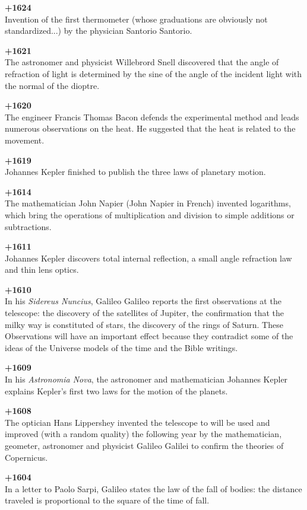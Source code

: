 \textbf{+1624}\\
Invention of the first thermometer (whose graduations are obviously not standardized...) by the physician Santorio Santorio.

\textbf{+1621}\\
The astronomer and physicist Willebrord Snell discovered that the angle of refraction of light is determined by the sine of the angle of the incident light with the normal of the dioptre.

\textbf{+1620}\\
The engineer Francis Thomas Bacon defends the experimental method and leads numerous observations on the heat. He suggested that the heat is related to the movement.

\textbf{+1619}\\
Johannes Kepler finished to publish the three laws of planetary motion.

\textbf{+1614}\\
The mathematician John Napier (John Napier in French) invented logarithms, which bring the operations of multiplication and division to simple additions or subtractions.

\textbf{+1611}\\
Johannes Kepler discovers total internal reflection, a small angle refraction law and thin lens optics.

\textbf{+1610}\\ In his \textit{Sidereus Nuncius}, Galileo Galileo reports the first observations at the telescope: the discovery of the satellites of Jupiter, the confirmation that the milky way is constituted of stars, the discovery of the rings of Saturn. These
Observations will have an important effect because they contradict some of the ideas of the Universe models of the time and the Bible writings.

\textbf{+1609}\\
In his \textit{Astronomia Nova}, the astronomer and mathematician Johannes Kepler explains Kepler's first two laws for the motion of the planets.

\textbf{+1608}\\
The optician Hans Lippershey invented the telescope to will be used and improved (with a random quality) the following year by the mathematician, geometer, astronomer and physicist Galileo Galilei to confirm the theories of Copernicus.

\textbf{+1604}\\
In a letter to Paolo Sarpi, Galileo states the law of the fall of bodies: the distance traveled is proportional to the square of the time of fall.

